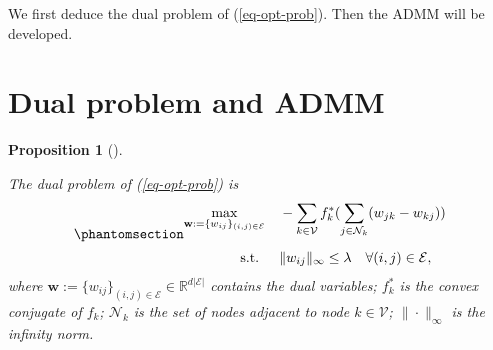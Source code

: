 \documentclass[
  letterpaper,
  DIV=11,
  numbers=noendperiod]{scrartcl}
\theoremstyle{plain}
\newtheorem{proposition}{Proposition}[section]
\theoremstyle{remark}
\begin{document}
We first deduce the dual problem of (\ref{eq-opt-prob}). Then the ADMM
will be developed.

\section{Dual problem and ADMM}\label{sec-dual-prob-ADMM}

\begin{proposition}[]\protect\hypertarget{prp-dual-prob}{}\label{prp-dual-prob}

The dual problem of (\ref{eq-opt-prob}) is
\begin{equation}\phantomsection\label{eq-dual-prob}{
\begin{aligned}
  \max_{\mathbf{w} := \{w_{ij}\}_{(i, j) \in \mathcal{E}}} & \quad - \sum_{k \in \mathcal{V}} f_k^{*} ( \sum_{j \in \mathcal{N}_k} (w_{jk} - w_{kj}) ) \\[0.2cm]
  \text{s.t. } & \quad \| w_{ij} \|_{\infty} \leq \lambda \quad \forall (i, j) \in \mathcal{E},
\end{aligned}
}\end{equation} where
\(\mathbf{w} := \{w_{ij}\}_{(i, j) \in \mathcal{E}} \in \mathbb{R}^{d| \mathcal{E} |}\)
contains the dual variables; \(f_k^{*}\) is the convex conjugate of
\(f_k\); \(\mathcal{N}_k\) is the set of nodes adjacent to node
\(k \in \mathcal{V}\); \(\| \cdot \|_{\infty}\) is the infinity norm.

\end{proposition}
\end{document}
